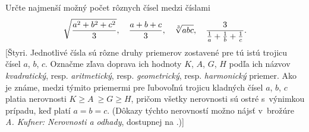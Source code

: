 {Určte najmenší možný počet rôznych čísel medzi
číslami
$$
\sqrt{\frac{a^2+b^2+c^2}{3}},\quad\frac{a+b+c}{3},\quad \root
3\of{abc},\quad \frac{3}{\frac1a + \frac1b+\frac1c}.
$$
[Štyri. Jednotlivé čísla sú rôzne druhy priemerov zostavené
pre tú istú trojicu čísel $a$, $b$, $c$. Označme zľava doprava ich hodnoty
$K$, $A$, $G$, $H$ podľa ich názvov {\it kvadratický}, resp.
{\it aritmetický}, resp. {\it geometrický}, resp. {\it harmonický} priemer.
Ako je známe, medzi týmito priemermi pre ľubovoľnú trojicu
kladných čísel $a$, $b$, $c$ platia nerovnosti $K \ge A~\ge G \ge H$,
pričom všetky nerovnosti sú ostré s~výnimkou prípadu, keď
platí $a=b=c$. (Dôkazy týchto nerovností možno nájsť v~brožúre
{\it A. Kufner: Nerovnosti a odhady}, dostupnej na
.)]

}


